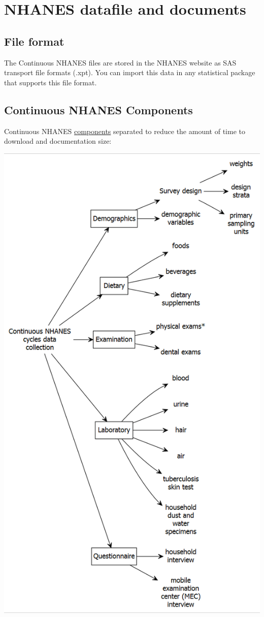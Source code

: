 \documentclass[
]{book}
\begin{document}
\hypertarget{nhanes-datafile-and-documents}{%
\chapter{NHANES datafile and documents}\label{nhanes-datafile-and-documents}}

\hypertarget{file-format}{%
\section{File format}\label{file-format}}

The Continuous NHANES files are stored in the NHANES website as SAS transport file formats (.xpt). You can import this data in any statistical package that supports this file format.

\hypertarget{continuous-nhanes-components}{%
\section{Continuous NHANES Components}\label{continuous-nhanes-components}}

Continuous NHANES \href{https://www.cdc.gov/nchs/tutorials/NHANES/SurveyOrientation/DataStructureContents/Info1.htm}{components} separated to reduce the amount of time to download and documentation size:

\includegraphics[width=0.65\linewidth]{images/g2}
\end{document}
